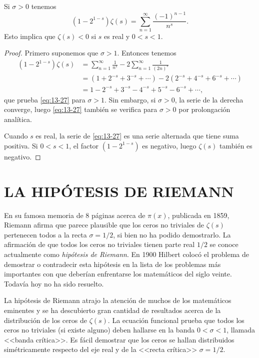     \begin{teorema}\label{teo:13-11}
        Si $\sigma>0$ tenemos
        \begin{equation}\label{eq:13-27}
            (1-2^{1-s})\zeta(s)=\sum_{n=1}^{\infty}\frac{(-1)^{n-1}}{n^s}.
        \end{equation}
        Esto implica que $\zeta(s)<0$ si $s$ es real y $0<s<1$.
    \end{teorema}

    \begin{proof}
        Primero suponemos que $\sigma>1$. Entonces tenemos
        \begin{align*}
            (1-2^{1-s})\zeta(s)&=\sum_{n=1}^{\infty}\frac{1}{n^s}-2\sum_{n=1}^{\infty}\frac{1}{(2n)^s}\\
            &=(1+2^{-s}+3^{-s}+\cdots)-2(2^{-s}+4^{-s}+6^{-s}+\cdots)\\
            &=1-2^{-s}+3^{-s}-4^{-s}+5^{-s}-6^{-s}+\cdots,
        \end{align*}
        que prueba \eqref{eq:13-27} para $\sigma>1$. Sin embargo, si $\sigma>0$, la serie de la
        derecha converge, luego \eqref{eq:13-27} también se verifica para $\sigma>0$ por
        prolongación analítica.

        Cuando $s$ es real, la serie de \eqref{eq:13-27} es una serie alternada que tiene suma
        positiva. Si $0<s<1$, el factor $(1-2^{1-s})$ es negativo, luego $\zeta(s)$ también es
        negativo.
    \end{proof}

    \section{LA HIPÓTESIS DE RIEMANN}

    En su famosa memoria de 8 páginas acerca de $\pi(x)$, publicada en 1859, Riemann
    \cite{riemann1859} afirma que parece plausible que los ceros no triviales de $\zeta(s)$
    pertenecen todos a la recta $\sigma=1/2$, si bien no ha podido demostrarlo. La afirmación
    de que todos los ceros no triviales tienen parte real $1/2$ se conoce actualmente como
    \textit{hipótesis de Riemann}. En 1900 Hilbert colocó el problema de demostrar o
    contradecir esta hipótesis en la lista de los problemas más importantes con que deberían
    enfrentarse los matemáticos del siglo veinte. Todavía hoy no ha sido resuelto.

    La hipótesis de Riemann atrajo la atención de muchos de los matemáticos eminentes y se ha
    descubierto gran cantidad de resultados acerca de la distribución de los ceros de
    $\zeta(s)$. La ecuación funcional prueba que todos los ceros no triviales (si existe
    alguno) deben hallarse en la banda $0<\sigma<1$, llamada <<banda crítica>>. Es fácil
    demostrar que los ceros se hallan distribuidos simétricamente respecto del eje real y de
    la <<recta crítica>> $\sigma=1/2$.

